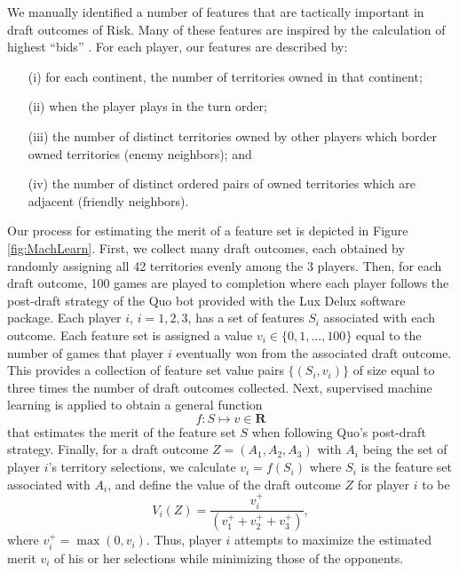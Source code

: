 \documentclass[letterpaper]{article}
\numberwithin{equation}{section}
\numberwithin{theorem}{section}
\numberwithin{lemma}{section}
\numberwithin{df}{section}
\begin{document}
We manually identified a number of features that are tactically important in draft outcomes of Risk.  Many of these features are inspired by the calculation of highest ``bids'' \cite{RiskBots}.  For each player, our features are described by: 
\begin{itemize}
\item[(i)] for each continent, the number of territories owned in that continent; \item[(ii)] when the player plays in the turn order; \item[(iii)] the number of distinct territories owned by other players which border owned territories (enemy neighbors); and \item[(iv)] the number of distinct ordered pairs of owned territories which are adjacent (friendly neighbors).
\end{itemize}  Our process for estimating the merit of a feature set is depicted in Figure \ref{fig:MachLearn}.  First, we collect many draft outcomes, each obtained by randomly assigning all 42 territories evenly among the 3 players.  Then, for each draft outcome, 100 games are played to completion where each player follows the post-draft strategy of the Quo bot provided with the Lux Delux software package.  Each player $i$, $i=1,2,3$, has a set of features $S_i$ associated with each outcome.  Each feature set is assigned a value $v_i \in \{0,1,...,100\}$ equal to the number of games that player $i$ eventually won from the associated draft outcome.  This provides a collection of feature set value pairs $\{(S_i, v_i)\}$ of size equal to three times the number of draft outcomes collected.  Next, supervised machine learning is applied to obtain a general function
\[ f: S \mapsto v \in \textbf{R} \] 
that estimates the merit of the feature set $S$ when following Quo's post-draft strategy.  Finally, for a draft outcome $Z = (A_1,A_2,A_3)$ with $A_i$ being the set of player $i$'s territory selections, we calculate $v_i = f(S_i)$ where $S_i$ is the feature set associated with $A_i$, and define the value of the draft outcome $Z$ for player $i$ to be
\[ V_i(Z) = \frac{v_i^+}{\left(v_1^+ + v_2^+ + v_3^+\right)}, \]
where $v_i^+ = \max(0, v_i)$.  
Thus, player $i$ attempts to maximize the estimated merit $v_i$ of his or her selections while minimizing those of the opponents.
\end{document}
